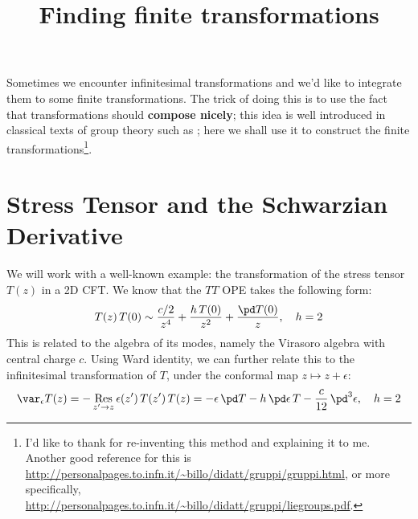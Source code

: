 \documentclass[a4paper
	,10pt
]{article}
\title{Finding finite transformations}
\begin{document}
\maketitle
{}
\thispagestyle{empty}

\vspace*{-.5\baselineskip}

	Sometimes we encounter infinitesimal transformations and we'd like to integrate them to some finite transformations. The trick of doing this is to use the fact that transformations should \textbf{compose nicely}; this idea is well introduced in classical texts of group theory such as \textcite{wybourne1993classical}; here we shall use it to construct the finite transformations\footnote{
		I'd like to thank  for re-inventing this method and explaining it to me. Another good reference for this is \url{http://personalpages.to.infn.it/~billo/didatt/gruppi/gruppi.html}, or more specifically, \url{http://personalpages.to.infn.it/~billo/didatt/gruppi/liegroups.pdf}. 
	}. 
	
\section{Stress Tensor and the Schwarzian Derivative}
	We will work with a well-known example: the transformation of the stress tensor $T(z)$ in a 2D CFT. We know that the $TT$ OPE takes the following form:
	\begin{equation}
		T(z)\,T(0)
		\sim \frac{c/2}{z^4}
			+ \frac{h\,T(0)}{z^2}
			+ \frac{\pd T(0)}{z},
	\quad h = 2
	\end{equation}
	This is related to the algebra of its modes, namely the Virasoro algebra with central charge $c$. Using Ward identity, we can further relate this to the infinitesimal transformation of $T$, under the conformal map $z\mapsto z+\epsilon$:
	\begin{equation}
		\var_\epsilon {T(z)}
		= - \operatorname*{Res}_{z'\to z}
				\epsilon(z')\,T(z')\,T(z)
		= - \epsilon\,\pd T
			- h\,\pd\epsilon\,T
			- \frac{c}{12}\,\pd^3 \epsilon,
	\quad h = 2
	\end{equation}
	
\end{document}
